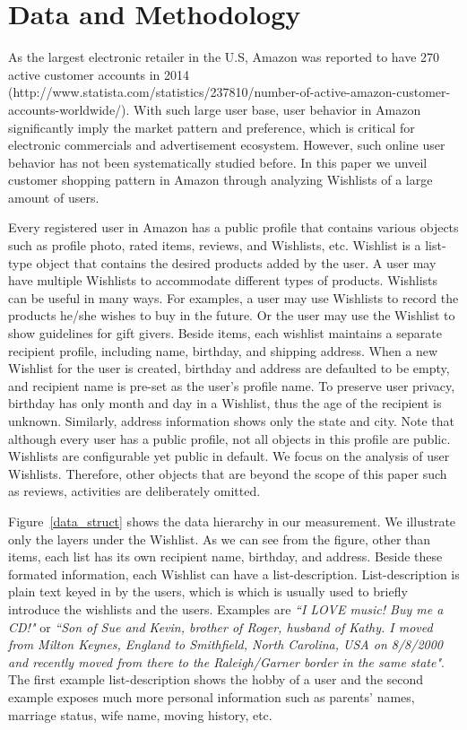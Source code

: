 \section{Data and Methodology}
As the largest electronic retailer in the U.S, Amazon was reported to have 270 active customer accounts in 2014 (http://www.statista.com/statistics/237810/number-of-active-amazon-customer-accounts-worldwide/). With such large user base, user behavior in Amazon significantly imply the market pattern and preference, which is critical for electronic commercials and advertisement ecosystem. However, such online user behavior has not been systematically studied before. In this paper we unveil customer shopping pattern in Amazon through analyzing Wishlists of a large amount of users.

Every registered user in Amazon has a public profile that contains various objects such as profile photo, rated items, reviews, and Wishlists, etc. Wishlist is a list-type object that contains the desired products added by the user. A user may have multiple Wishlists to accommodate different types of products. Wishlists can be useful in many ways. For examples, a user may use Wishlists to record the products he/she wishes to buy in the future. Or the user may use the Wishlist to show guidelines for gift givers. Beside items, each wishlist maintains a separate recipient profile, including name, birthday, and shipping address. When a new Wishlist for the user is created, birthday and address are defaulted to be empty, and recipient name is pre-set as the user's profile name. To preserve user privacy, birthday has only month and day in a Wishlist, thus the age of the recipient is unknown. Similarly, address information shows only the state and city. Note that although every user has a public profile, not all objects in this profile are public. Wishlists are configurable yet public in default. We focus on the analysis of user Wishlists. Therefore, other objects that are beyond the scope of this paper such as reviews, activities are deliberately omitted.

Figure~\ref{data_struct} shows the data hierarchy in our measurement. We illustrate only the layers under the Wishlist. As we can see from the figure, other than items, each list has its own recipient name, birthday, and address. Beside these formated information, each Wishlist can have a list-description. List-description is plain text keyed in by the users, which is which is usually used to briefly introduce the wishlists and the users. Examples are \emph{``I LOVE music! Buy me a CD!"} or \emph{``Son of Sue and Kevin, brother of Roger, husband of Kathy. I moved from Milton Keynes, England to Smithfield, North Carolina, USA on 8/8/2000 and recently moved from there to the Raleigh/Garner border in the same state"}. The first example list-description shows the hobby of a user and the second example exposes much more personal information such as parents' names, marriage status, wife name, moving history, etc. 

